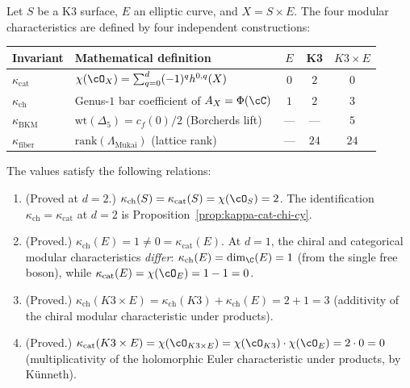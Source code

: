 \begin{proposition}
\label{prop:kappa-spectrum-reconciliation}
\ClaimStatusProvedHere
Let $S$ be a K3 surface, $E$ an elliptic curve, and $X = S \times E$.  The four modular characteristics are defined by four independent constructions:

\begin{center}
\renewcommand{\arraystretch}{1.35}
\begin{tabular}{llccc}
 \toprule
 \textbf{Invariant} & \textbf{Mathematical definition} & \textbf{$E$} & \textbf{K3} & \textbf{$K3 \times E$} \\
 \midrule
 $\kappa_{\mathrm{cat}}$ & $\chi(\cO_X) = \sum_{q=0}^{d}(-1)^q h^{0,q}(X)$ & $0$ & $2$ & $0$ \\[3pt]
 $\kappa_{\mathrm{ch}}$  & Genus-$1$ bar coefficient of $A_X = \Phi(\cC)$ & $1$ & $2$ & $3$ \\[3pt]
 $\kappa_{\mathrm{BKM}}$ & $\mathrm{wt}(\Delta_5) = c_f(0)/2$ (Borcherds lift) & --- & --- & $5$ \\[3pt]
 $\kappa_{\mathrm{fiber}}$ & $\mathrm{rank}(\Lambda_{\mathrm{Mukai}})$ (lattice rank) & --- & $24$ & $24$ \\
 \bottomrule
\end{tabular}
\end{center}

\noindent
The values satisfy the following relations:
\begin{enumerate}[label=\textup{(\roman*)}]
 \item \textup{(Proved at $d=2$.)}  $\kappa_{\mathrm{ch}}(S) = \kappa_{\mathrm{cat}}(S) = \chi(\cO_S) = 2$.
  The identification $\kappa_{\mathrm{ch}} = \kappa_{\mathrm{cat}}$ at $d = 2$ is Proposition~\textup{\ref{prop:kappa-cat-chi-cy}}.

 \item \textup{(Proved.)} $\kappa_{\mathrm{ch}}(E) = 1 \neq 0 = \kappa_{\mathrm{cat}}(E)$.
  At $d = 1$, the chiral and categorical modular characteristics \emph{differ}: $\kappa_{\mathrm{ch}}(E) = \dim_\C(E) = 1$ (from the single free boson), while $\kappa_{\mathrm{cat}}(E) = \chi(\cO_E) = 1 - 1 = 0$.

 \item \textup{(Proved.)} $\kappa_{\mathrm{ch}}(K3 \times E) = \kappa_{\mathrm{ch}}(K3) + \kappa_{\mathrm{ch}}(E) = 2 + 1 = 3$ (additivity of the chiral modular characteristic under products).

 \item \textup{(Proved.)} $\kappa_{\mathrm{cat}}(K3 \times E) = \chi(\cO_{K3 \times E}) = \chi(\cO_{K3}) \cdot \chi(\cO_E) = 2 \cdot 0 = 0$ (multiplicativity of the holomorphic Euler characteristic under products, by K\"unneth).


\end{enumerate}
\end{proposition}
